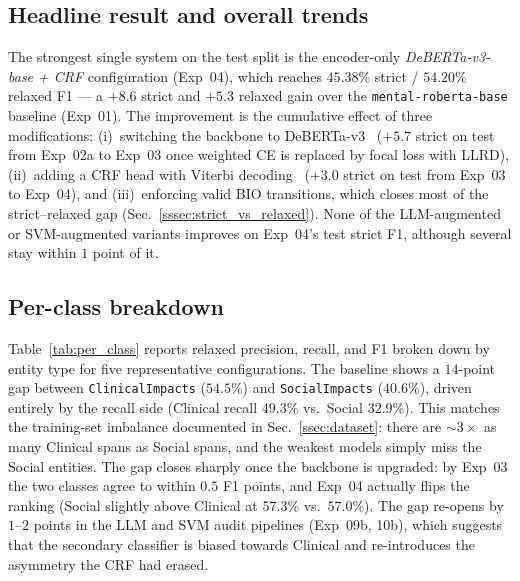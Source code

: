 \documentclass[journal]{IEEEtran}
\begin{document}
\subsection{Headline result and overall trends}
The strongest single system on the test split is the encoder-only
\emph{DeBERTa-v3-base + CRF} configuration (Exp~04), which reaches
$45.38\%$ strict / $54.20\%$ relaxed F1 --- a $+8.6$ strict and
$+5.3$ relaxed gain over the \texttt{mental-roberta-base} baseline
(Exp~01). The improvement is the cumulative effect of three
modifications: (i)~switching the backbone to
DeBERTa-v3~\cite{he2023debertav3} ($+5.7$ strict on test from
Exp~02a to Exp~03 once weighted CE is replaced by focal loss with
LLRD), (ii)~adding a CRF head with Viterbi decoding~\cite{lample2016neural,
lafferty2001crf} ($+3.0$ strict on test from Exp~03 to Exp~04), and
(iii)~enforcing valid BIO transitions, which closes most of the
strict--relaxed gap (Sec.~\ref{sssec:strict_vs_relaxed}). None of the
LLM-augmented or SVM-augmented variants improves on Exp~04's test
strict F1, although several stay within $1$ point of it.

\subsection{Per-class breakdown}
Table~\ref{tab:per_class} reports relaxed precision, recall, and F1
broken down by entity type for five representative configurations.
The baseline shows a $14$-point gap between
\texttt{ClinicalImpacts} ($54.5\%$) and \texttt{SocialImpacts}
($40.6\%$), driven entirely by the recall side
(Clinical recall $49.3\%$ vs.\ Social $32.9\%$). This matches the
training-set imbalance documented in Sec.~\ref{ssec:dataset}: there
are $\sim$$3{\times}$ as many Clinical spans as Social spans, and the
weakest models simply miss the Social entities. The gap closes
sharply once the backbone is upgraded: by Exp~03 the two classes
agree to within $0.5$ F1 points, and Exp~04 actually flips the
ranking (Social slightly above Clinical at $57.3\%$ vs.\ $57.0\%$).
The gap re-opens by $1$--$2$ points in the LLM and SVM audit
pipelines (Exp~09b, 10b), which suggests that the secondary
classifier is biased towards Clinical and re-introduces the
asymmetry the CRF had erased.
\end{document}
